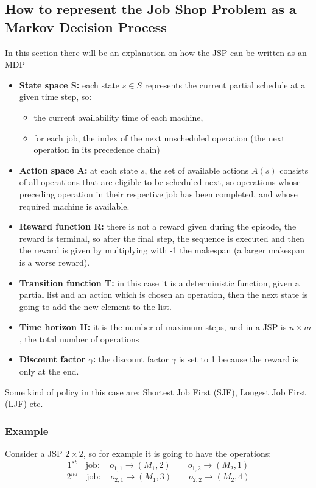 \documentclass[12pt]{book}
\begin{document}
\subsection{How to represent the Job Shop Problem as a Markov Decision Process}
In this section there will be an explanation on how the JSP can be written as an MDP
\begin{itemize}
    \item \textbf{State space S:} each state $s\in S$ represents the current partial schedule at a given time step, so:
    \begin{itemize}
        \item the current availability time of each machine,
        \item for each job, the index of the next unscheduled operation (the next operation in its precedence chain)
    \end{itemize}
    \item \textbf{Action space A:} at each state $s$, the set of available actions $A(s)$ consists of all operations that are eligible to be scheduled next, so operations whose preceding operation in their respective job has been completed, and whose required machine is available. 
    \item \textbf{Reward function R:} there is not a reward given during the episode, the reward is terminal, so after the final step, the  sequence is executed and then the reward is given by multiplying with -1 the makespan (a larger makespan is a worse reward).
    \item \textbf{Transition function T:} in this case it is a deterministic function, given a partial list and an action which is chosen an operation, then the next state is going to add the new element to the list.
    \item \textbf{Time horizon H:} it is the number of maximum steps, and in a JSP is $n\times m$, the total number of operations
    \item \textbf{Discount factor $\gamma$:} the discount factor $\gamma$ is set to 1 because the reward is only at the end.
\end{itemize}

Some kind of policy in this case are: Shortest Job First (SJF), Longest Job First (LJF) etc.

\subsubsection{Example}
Consider a JSP $2\times2$, so for example it is going to have the operations:
$$1^{st}\quad\mathrm{job}:\quad o_{1,1}\rightarrow (M_1, 2) \qquad o_{1,2}\rightarrow (M_2, 1)$$
$$2^{nd}\quad\mathrm{job}:\quad o_{2,1}\rightarrow (M_1, 3) \qquad o_{2,2}\rightarrow (M_2, 4)$$
\end{document}
